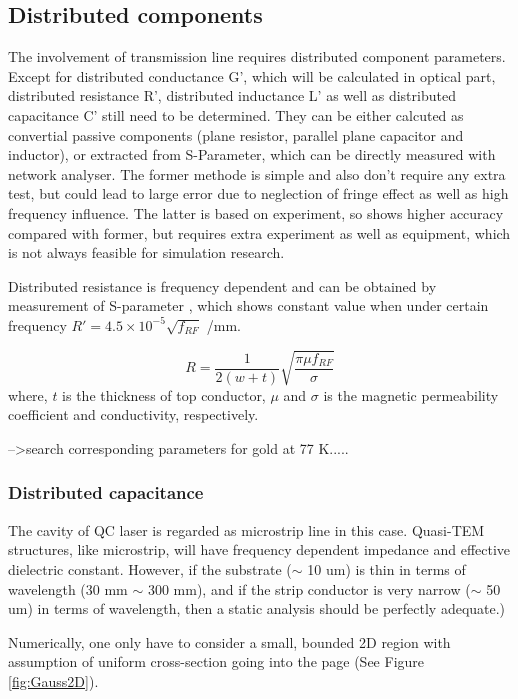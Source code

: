 \documentclass[11pt,final]{scrbook}
\begin{document}
\subsection{Distributed components}
The involvement of transmission line requires distributed component parameters. Except for distributed conductance G', which will be calculated in optical part, distributed resistance R', distributed inductance L' as well as distributed capacitance C' still need to be determined. They can be either calcuted as convertial passive components (plane resistor, parallel plane capacitor and inductor), or extracted from S-Parameter, which can be directly measured with network analyser. The former methode is simple and also don't require any extra test, but could lead to large error due to neglection of fringe effect\cite{pillai1970fringing} as well as high frequency influence. The latter is based on experiment, so shows higher accuracy compared with former, but requires extra experiment as well as equipment, which is not always feasible for simulation research. 

Distributed resistance is frequency dependent and can be obtained by measurement of S-parameter \cite{maineult2010microwave}, which shows constant value when under certain frequency $ R'=4.5\times10^{-5}\sqrt{f_{RF}}$ /mm.

\begin{equation}
R=\frac{1}{2(w+t)}\sqrt{\frac{\pi \mu f_{RF} }{\sigma}}
\end{equation}
where, $t$ is the thickness of top conductor, $\mu$ and $\sigma$ is the magnetic permeability coefficient and conductivity, respectively.

-->search corresponding parameters for gold at 77 K.....

\subsubsection{Distributed capacitance}
The cavity of QC laser is regarded as microstrip line in this case. Quasi-TEM structures, like microstrip, will have frequency dependent impedance and effective dielectric constant. However, if the substrate ($\sim$ 10 um) is thin in terms of wavelength (30 mm $\sim$ 300 mm), and if the strip conductor is very narrow ($\sim$ 50 um) in terms of wavelength, then a static analysis should be perfectly adequate.)

Numerically, one only have to consider a small, bounded 2D region with assumption of uniform cross-section going into the page (See Figure \ref{fig:Gauss2D}). 
\end{document}
